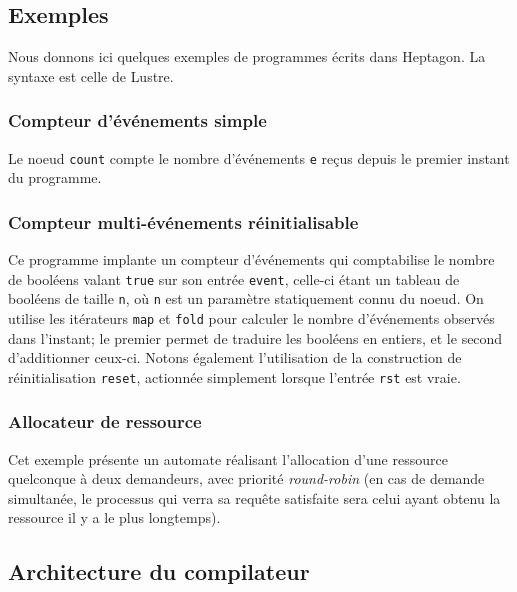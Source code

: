 \documentclass[a4paper]{article}
\newcommand{\LANG}{{\sc Heptagon}}
\newcommand{\lustre}{{\sc Lustre}}
\begin{document}
\subsection{Exemples}

Nous donnons ici quelques exemples de programmes \'ecrits dans \LANG. La
syntaxe est celle de \lustre.

\subsubsection{Compteur d'\'ev\'enements simple}



Le noeud \texttt{count} compte le nombre d'\'ev\'enements \texttt{e} re\c{c}us
depuis le premier instant du programme.

\subsubsection{Compteur multi-\'ev\'enements r\'einitialisable}



Ce programme implante un compteur d'\'ev\'enements qui comptabilise le
nombre de bool\'eens valant \texttt{true} sur son entr\'ee
\texttt{event}, celle-ci \'etant un tableau de bool\'eens de taille
\texttt{n}, o\`u \texttt{n} est un param\`etre statiquement connu du
noeud. On utilise les it\'erateurs \texttt{map} et \texttt{fold} pour
calculer le nombre d'\'ev\'enements observ\'es dans l'instant; le
premier permet de traduire les bool\'eens en entiers, et le second
d'additionner ceux-ci. Notons \'egalement l'utilisation de la
construction de r\'einitialisation \texttt{reset}, actionn\'ee
simplement lorsque l'entr\'ee \texttt{rst} est vraie.

\subsubsection{Allocateur de ressource}



Cet exemple pr\'esente un automate r\'ealisant l'allocation d'une ressource
quelconque \`a deux demandeurs, avec priorit\'e \textit{round-robin} (en cas de
demande simultan\'ee, le processus qui verra sa requ\^ete satisfaite sera celui
ayant obtenu la ressource il y a le plus longtemps).

\subsection{Architecture du compilateur}
\end{document}
